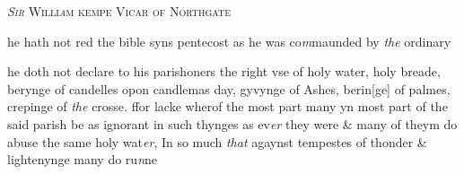 \documentclass[12pt, a4paper]{book}
\begin{document}
            
               
				\begin{center} \begin{large} {\scshape 
               	\textit{Sir} Willi\textit{a}m kempe Vicar of Northgate} \end{large} \end{center}
			

 
		\ifthenelse{\isodd{\thepage}}
		{\reversemarginpar}
		{\normalmarginpar}
		he hath not red the bible syns pentecost as he was co\textit{m}maunded
 by \textit{the} ordinary
            	
            		
				\marginpar[\vspace{0.5cm}{\textcolor{Gray}{ceremonies}}]{}
			
            		
		\ifthenelse{\isodd{\thepage}}
		{\reversemarginpar}
		{\normalmarginpar}
		he doth not declare  to his parishoners
			 the right vse of holy water, holy breade,
 berynge of candelles opon candlemas day, gyvynge of Ashes, berin[ge]
 of palmes, crepinge of \textit{the} crosse. ffor lacke wherof the most part
			 many yn most part of the
 said parish be as ignorant in such thynges as ev\textit{er} they were
 \& many of theym do abuse the same holy wat\textit{er}, In so much \textit{that}
 agaynst tempestes of thonder \& lightenynge many do ru\textit{n}ne
            	


\dotfill
					  \subsection*{}  \subsection*{}  \subsection*{}  \subsection*{}
\end{document}
